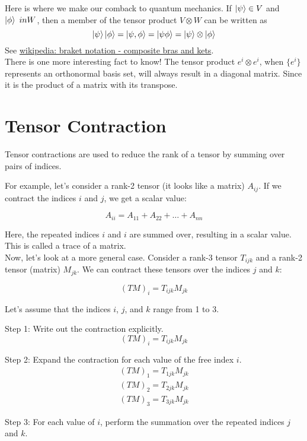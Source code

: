 Here is where we make our comback to quantum mechanics.
If $\ket{\psi} \in V$ and $\ket{\phi} \ in W$, then a member of the tensor product $V \otimes W$ can be written
as
$$
\ket{\psi}\ket{\phi} = \ket{\psi, \phi} = \ket{\psi\phi} = \ket{\psi} \otimes \ket{\phi}
$$
See
\href{https://en.wikipedia.org/wiki/Bra%E2%80%93ket_notation}{wikipedia: braket notation - composite bras and kets}.
\\

There is one more interesting fact to know!
The tensor product $e^i \otimes e^i$, when $\{e^i\}$ represents an orthonormal basis set,
will always result in a diagonal matrix.
Since it is the product of a matrix with its transpose.


\section{Tensor Contraction}


Tensor contractions are used to reduce the rank of a tensor by summing over pairs of indices.

For example, let's consider a rank-2 tensor (it looks like a matrix) $A_{ij}$.
If we contract the indices $i$ and $j$, we get a scalar value:

$$
A_{ii} = A_{11} + A_{22} + \dots + A_{nn}
$$

Here, the repeated indices $i$ and $i$ are summed over, resulting in a scalar value.
This is called a trace of a matrix.
\\

Now, let's look at a more general case.
Consider a rank-3 tensor $T_{ijk}$ and a rank-2 tensor (matrix) $M_{jk}$.
We can contract these tensors over the indices $j$ and $k$:

$$
(TM)_i = T_{ijk} M_{jk}
$$

Let's assume that the indices $i$, $j$, and $k$ range from 1 to 3.

Step 1: Write out the contraction explicitly.
$$
(TM)_i = T_{ijk} M_{jk}
$$

Step 2: Expand the contraction for each value of the free index $i$.
\begin{align*}
(TM)_1 = T_{1jk} M_{jk} \\
(TM)_2 = T_{2jk} M_{jk} \\
(TM)_3 = T_{3jk} M_{jk}
\end{align*}

Step 3: For each value of $i$, perform the summation over the repeated indices $j$ and $k$.

